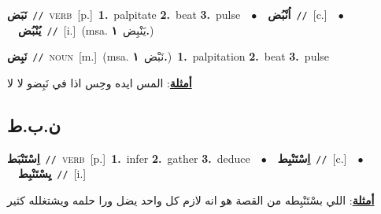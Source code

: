 \documentclass[10pt,a4paper,twoside]{article} %
\begin{document}
\begin{multicols}{2}
{\setlength\topsep{0pt}\textbf{\foreignlanguage{arabic}{نَبَض}}\ {\color{gray}\texttt{//}\color{black}}\ \textsc{verb}\ [p.]\ \textbf{1.}~palpitate  \textbf{2.}~beat  \textbf{3.}~pulse\ \ $\bullet$\ \ \setlength\topsep{0pt}\textbf{\foreignlanguage{arabic}{اُنْبُض}}\ {\color{gray}\texttt{//}\color{black}}\ [c.]\ \ $\bullet$\ \ \setlength\topsep{0pt}\textbf{\foreignlanguage{arabic}{يُنْبُض}}\ {\color{gray}\texttt{//}\color{black}}\ [i.]\ \color{gray}(msa. \foreignlanguage{arabic}{يَنْبِض}~\foreignlanguage{arabic}{\textbf{١.}})\color{black}\ } \vspace{2mm}

{\setlength\topsep{0pt}\textbf{\foreignlanguage{arabic}{نَبِض}}\ {\color{gray}\texttt{//}\color{black}}\ \textsc{noun}\ [m.]\ \color{gray}(msa. \foreignlanguage{arabic}{نَبْض}~\foreignlanguage{arabic}{\textbf{١.}})\color{black}\ \textbf{1.}~palpitation  \textbf{2.}~beat  \textbf{3.}~pulse\  \begin{flushright}\color{gray}\foreignlanguage{arabic}{\textbf{\underline{\foreignlanguage{arabic}{أمثلة}}}: المس ايده وحِس اذا في نَبِضو لا لا}\end{flushright}\color{black}} \vspace{2mm}

\vspace{-3mm}
\subsection*{\color{blue}\foreignlanguage{arabic}{ن.ب.ط}\color{blue}{}} 

{\setlength\topsep{0pt}\textbf{\foreignlanguage{arabic}{اِسْتَنْبَط}}\ {\color{gray}\texttt{//}\color{black}}\ \textsc{verb}\ [p.]\ \textbf{1.}~infer  \textbf{2.}~gather  \textbf{3.}~deduce\ \ $\bullet$\ \ \setlength\topsep{0pt}\textbf{\foreignlanguage{arabic}{اِسْتَنْبِط}}\ {\color{gray}\texttt{//}\color{black}}\ [c.]\ \ $\bullet$\ \ \setlength\topsep{0pt}\textbf{\foreignlanguage{arabic}{يِسْتَنْبِط}}\ {\color{gray}\texttt{//}\color{black}}\ [i.]\  \begin{flushright}\color{gray}\foreignlanguage{arabic}{\textbf{\underline{\foreignlanguage{arabic}{أمثلة}}}: اللي بسْتَنْبِطه من القصة هو انه لازم كل واحد يضل ورا حلمه ويشتغلله كثير}\end{flushright}\color{black}} \vspace{2mm}


\end{multicols}
\end{document}
